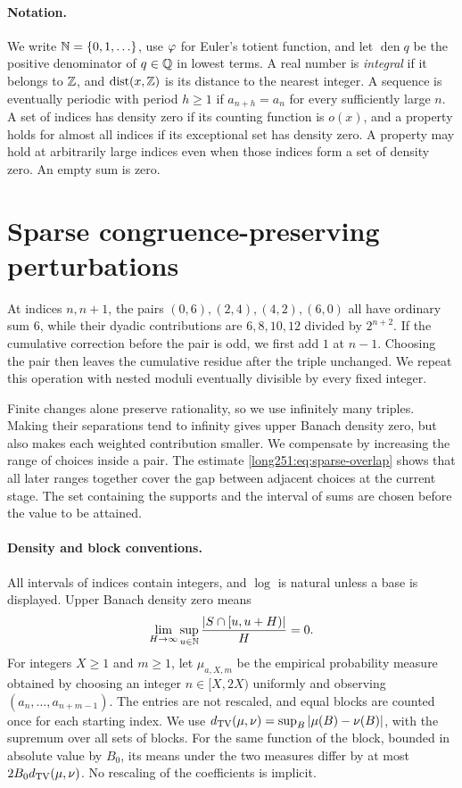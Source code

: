 \documentclass[11pt]{article}
\begin{document}
\paragraph{Notation.}
We write $\mathbb{N}=\{0,1,\ldots\}$, use $\varphi$ for Euler's totient function,
and let $\operatorname{den}q$ be the positive denominator of $q\in\mathbb{Q}$
in lowest terms.  A real number is \emph{integral} if it belongs to $\mathbb{Z}$,
and $\operatorname{dist}(x,\mathbb{Z})$ is its distance to the nearest integer.
A sequence is eventually periodic with period $h\ge1$ if
$a_{n+h}=a_n$ for every sufficiently large $n$.  A set of indices has
density zero if its counting function is $o(x)$, and a property holds
for almost all indices if its exceptional set has density zero.
A property may hold at arbitrarily large indices even when those indices
form a set of density zero.  An empty sum is zero.

\section{Sparse congruence-preserving perturbations}
\label{long251:sec:paired-corrections}

At indices $n,n+1$, the pairs $(0,6),(2,4),(4,2),(6,0)$ all have
ordinary sum $6$, while their dyadic contributions are $6,8,10,12$
divided by $2^{n+2}$.  If the cumulative correction before the pair is
odd, we first add $1$ at $n-1$.  Choosing the pair then leaves the
cumulative residue after the triple unchanged.  We repeat this operation
with nested moduli eventually divisible by every fixed integer.

Finite changes alone preserve rationality, so we use infinitely many
triples.  Making their separations tend to infinity gives upper Banach
density zero, but also makes each weighted contribution smaller.  We
compensate by increasing the range of choices inside a pair.  The estimate
\eqref{long251:eq:sparse-overlap} shows that all later ranges together
cover the gap between adjacent choices at the current stage.
The set containing the supports and the interval of sums are chosen before the value to be attained.

\paragraph{Density and block conventions.}
All intervals of indices contain integers, and $\log$ is natural unless
a base is displayed.  Upper Banach density zero means
\[
 \lim_{H\to\infty}\sup_{u\in\mathbb{N}}\frac{|S\cap[u,u+H)|}{H}=0.
\]
For integers $X\ge1$ and $m\ge1$, let $\mu_{a,X,m}$ be the empirical
probability measure obtained by choosing an integer $n\in[X,2X)$ uniformly
and observing $(a_n,\ldots,a_{n+m-1})$.  The entries are not rescaled,
and equal blocks are counted once for each starting index.
We use $d_{\rm TV}(\mu,\nu)=\sup_B|\mu(B)-\nu(B)|$, with the supremum over all sets of blocks.  For the same function
of the block, bounded in absolute value by $B_0$, its means under the two
measures differ by at most $2B_0d_{\rm TV}(\mu,\nu)$.
No rescaling of the coefficients is implicit.
\end{document}
